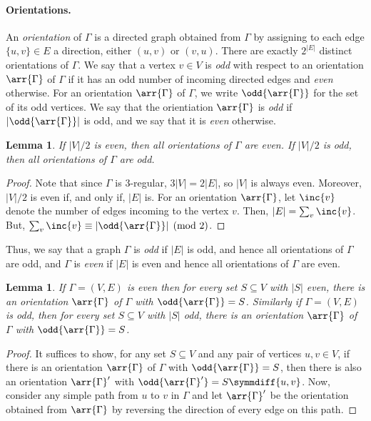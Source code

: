 \documentclass[11pt]{article}
\newtheorem{lemma}[theorem]{Lemma}
\begin{document}
\paragraph{Orientations.}
An \emph{orientation} of $\Gamma$ is a directed graph obtained from $\Gamma$ by assigning
to each edge $\{u,v\} \in E$ a direction, either $(u,v)$ or $(v,u)$. There are
exactly $2^{|E|}$ distinct orientations of $\Gamma$. We say that a vertex $v \in V$
is \emph{odd} with respect to an orientation $\arr{\Gamma}$ of $\Gamma$ if it has an odd
number of incoming directed edges and \emph{even} otherwise. For an orientation
$\arr{\Gamma}$ of $\Gamma$, we write $\odd{\arr{\Gamma}}$ for the set of its odd vertices. We
say that the orientiation $\arr{\Gamma}$ is \emph{odd} if $|\odd{\arr{\Gamma}}|$ is odd,
and we say that
%
it is \emph{even} otherwise.
\begin{lemma}\label{lem:orientation-parity}
  If $|V|/2$ is even, then all orientations of $\Gamma$ are even. If $|V|/2$ is odd,
  then all orientations of $\Gamma$ are odd.
\end{lemma}
\begin{proof}
  Note that since $\Gamma$ is $3$-regular, $3|V| = 2|E|$, so $|V|$ is always even.
  Moreover, $|V|/2$ is even if, and only if, $|E|$ is. For an orientation
  $\arr{\Gamma}$, let $\inc{v}$ denote the number of edges incoming to the vertex
  $v$. Then, $|E| = \sum_v \inc{v}$. But, $\sum_v \inc{v} \equiv |\odd{\arr{\Gamma}}|
  \pmod 2$.
\end{proof}
Thus, we say that a graph $\Gamma$ is \emph{odd} if $|E|$ is odd, and hence all
orientations of $\Gamma$ are odd, and $\Gamma$ is \emph{even} if $|E|$ is even and hence
all orientations of $\Gamma$ are even.
\begin{lemma}\label{lem:transitive-parity}
  If $\Gamma = (V,E)$ is even then for every set $S \subseteq V$ with $|S|$ even,
  there is an orientation $\arr{\Gamma}$ of $\Gamma$ with $\odd{\arr{\Gamma}} = S$. Similarly
  if $\Gamma = (V,E)$ is odd, then for every set $S \subseteq V$ with $|S|$ odd,
  there is an orientation $\arr{\Gamma}$ of $\Gamma$ with $\odd{\arr{\Gamma}} = S$.
\end{lemma}
\begin{proof}
  It suffices to show, for any set $S \subseteq V$ and any pair of vertices $u,v
  \in V$, if there is an orientation $\arr{\Gamma}$ of $\Gamma$ with $\odd{\arr{\Gamma}} = S$,
  then there is also an orientation $\arr{\Gamma}'$ with $\odd{\arr{\Gamma}'} = S
  \symmdiff \{u,v\}$. Now, consider any simple path from $u$ to $v$ in $\Gamma$ and
  let $\arr{\Gamma}'$ be the orientation obtained from $\arr{\Gamma}$ by reversing the
  direction of every edge on this path.
\end{proof}
\end{document}
